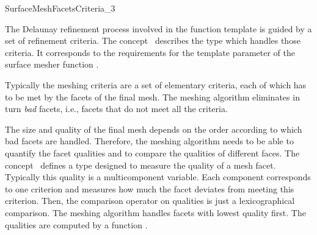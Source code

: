 

\begin{ccRefConcept}{SurfaceMeshFacetsCriteria_3}

\ccDefinition
  
The Delaunay refinement process involved in  the 
function template  
is guided by a set of refinement criteria.
The concept \ccRefName\ describes the type  which
handles those criteria. 
It corresponds to the requirements for the template parameter
 of the surface mesher function
.

Typically the meshing criteria are a set
of elementary criteria, each of which
has to be met by  the facets of the final mesh.
The meshing algorithm eliminates in turn  {\em bad} facets, i.e.,
facets that do not meet all the criteria.

The size and quality of the final mesh 
depends on the order according to which bad facets
are handled. Therefore, the meshing algorithm 
needs to be able to quantify the facet qualities and to compare
the qualities of different faces.
The concept \ccRefName\ 
defines a type  designed to measure
the quality of a mesh facet. 
Typically this quality
is a multicomponent variable.  Each component corresponds to
one criterion and measures how much the facet deviates from
meeting this criterion. Then, the  comparison operator on qualities
is just a lexicographical comparison. The meshing algorithm handles facets
with lowest quality first. The qualities are computed by a function
\ccc{is_bad(Facet f, Quality& q)}.

\ccTypes



\end{ccRefConcept}
